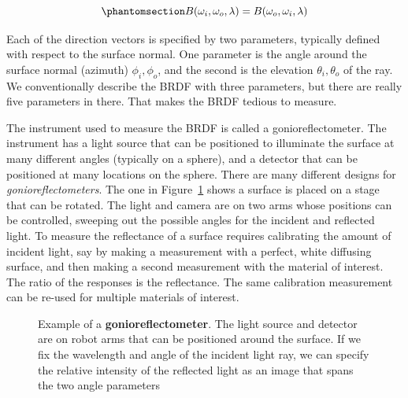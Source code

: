 \documentclass[
  letterpaper,
]{book}
\begin{document}
\begin{equation}\phantomsection\label{eq-BRDF1}{
B(\omega_i,\omega_o,\lambda) = B(\omega_o,\omega_i,\lambda)
}\end{equation}

Each of the direction vectors is specified by two parameters, typically
defined with respect to the surface normal. One parameter is the angle
around the surface normal (azimuth) \(\phi_i, \phi_o\), and the second
is the elevation \(\theta_i, \theta_o\) of the ray. We conventionally
describe the BRDF with three parameters, but there are really five
parameters in there. That makes the BRDF tedious to measure.

The instrument used to measure the BRDF is called a gonioreflectometer.
The instrument has a light source that can be positioned to illuminate
the surface at many different angles (typically on a sphere), and a
detector that can be positioned at many locations on the sphere. There
are many different designs for \emph{gonioreflectometers}. The one in
Figure~\ref{fig-gonioreflectometer} shows a surface is placed on a stage
that can be rotated. The light and camera are on two arms whose
positions can be controlled, sweeping out the possible angles for the
incident and reflected light. To measure the reflectance of a surface
requires calibrating the amount of incident light, say by making a
measurement with a perfect, white diffusing surface, and then making a
second measurement with the material of interest. The ratio of the
responses is the reflectance. The same calibration measurement can be
re-used for multiple materials of interest.

\begin{figure}


\caption{\label{fig-gonioreflectometer}Example of a
\textbf{gonioreflectometer}. The light source and detector are on robot
arms that can be positioned around the surface. If we fix the wavelength
and angle of the incident light ray, we can specify the relative
intensity of the reflected light as an image that spans the two angle
parameters}

\end{figure}%
\end{document}
